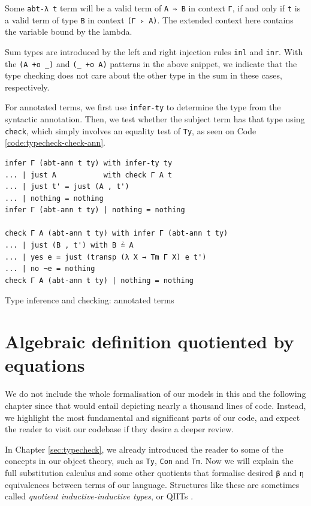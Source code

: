 Some \verb$abt-λ t$ term will be a valid term of \verb$A ⇒ B$ in context \verb$Γ$, if and only if \verb$t$ is a valid term of type \verb$B$ in context \verb$(Γ ▹ A)$. The extended context here contains the variable bound by the lambda.

Sum types are introduced by the left and right injection rules \verb$inl$ and \verb$inr$. With the \verb$(A +o _)$ and \verb$(_ +o A)$ patterns in the above snippet, we indicate that the type checking does not care about the other type in the sum in these cases, respectively.

For annotated terms, we first use \verb$infer-ty$ to determine the type from the syntactic annotation. Then, we test whether the subject term has that type using \verb$check$, which simply involves an equality test of \verb$Ty$, as seen on Code \ref{code:typecheck-check-ann}.

\begin{listing}[H]
\begin{verbatim}
infer Γ (abt-ann t ty) with infer-ty ty
... | just A           with check Γ A t
... | just t' = just (A , t')
... | nothing = nothing
infer Γ (abt-ann t ty) | nothing = nothing

check Γ A (abt-ann t ty) with infer Γ (abt-ann t ty)
... | just (B , t') with B ≟ A
... | yes e = just (transp (λ X → Tm Γ X) e t')
... | no ¬e = nothing
check Γ A (abt-ann t ty) | nothing = nothing
\end{verbatim}
\caption{Type inference and checking: annotated terms}
\label{code:typecheck-check-ann}
\end{listing}

\section{Algebraic definition quotiented by equations} \label{sec:algebraic-def}

We do not include the whole formalisation of our models in this and the following chapter since that would entail depicting nearly a thousand lines of code. Instead, we highlight the most fundamental and significant parts of our code, and expect the reader to visit our codebase if they desire a deeper review.

In Chapter \ref{sec:typecheck}, we already introduced the reader to some of the concepts in our object theory, such as \verb$Ty$, \verb$Con$ and \verb$Tm$. Now we will explain the full substitution calculus and some other quotients that formalise desired \verb$β$ and \verb$η$ equivalences between terms of our language. Structures like these are sometimes called \textit{quotient inductive-inductive types}, or QIITs \cite{altenkirch2018quotient}.

